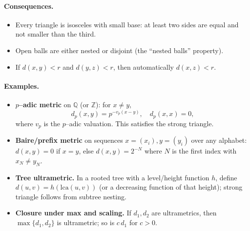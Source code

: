 \documentclass[12pt,a4paper]{article}
\begin{document}
\paragraph{Consequences.}
\begin{itemize}
\item Every triangle is isosceles with small base: at least two sides are equal and not smaller than the third.
\item Open balls are either nested or disjoint (the ``nested balls'' property).
\item If $d(x,y)<r$ and $d(y,z)<r$, then automatically $d(x,z)<r$.
\end{itemize}
\paragraph{Examples.}
\begin{itemize}
\item \textbf{$p$--adic metric} on $\mathbb{Q}$ (or $\mathbb{Z}$): for $x\ne y$,
\[
d_p(x,y)=p^{-v_p(x-y)},\quad d_p(x,x)=0,
\]
where $v_p$ is the $p$--adic valuation. This satisfies the strong triangle.
\item \textbf{Baire/prefix metric} on sequences $x=(x_i),y=(y_i)$ over any alphabet: $d(x,y)=0$ if $x=y$, else $d(x,y)=2^{-N}$ where $N$ is the first index with $x_N\ne y_N$.
\item \textbf{Tree ultrametric.} In a rooted tree with a level/height function $h$, define $d(u,v)=h(\mathrm{lca}(u,v))$ (or a decreasing function of that height); strong triangle follows from subtree nesting.
\item \textbf{Closure under max and scaling.} If $d_1,d_2$ are ultrametrics, then $\max\{d_1,d_2\}$ is ultrametric; so is $c\,d_1$ for $c>0$.
\end{itemize}
\end{document}
